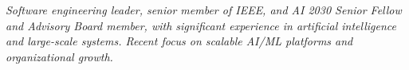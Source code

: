 {\selectfont
	\begin{justify}\textit{Software engineering leader, senior member of IEEE, and AI 2030 Senior Fellow and Advisory Board member, with significant experience in artificial intelligence and large-scale systems. Recent focus on scalable AI/ML platforms and organizational growth.}\end{justify}
}